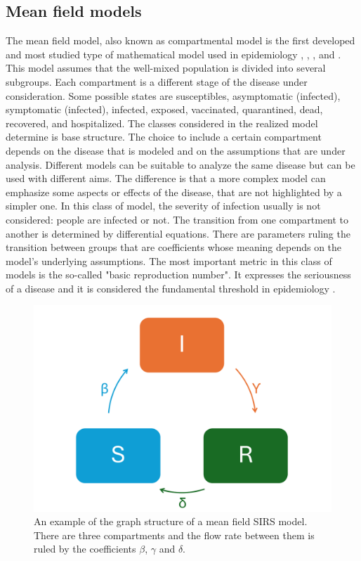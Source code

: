 \subsection{Mean field models}
\label{subsec:mean_field}
The mean field model, also known as compartmental model is the first developed and most studied type of mathematical model used in epidemiology \cite{kermack1927}, \cite{brauer2012mathematical}, \cite{Anderson_82}, and \cite{anderson1991infectious}.  This model assumes that the well-mixed population is divided into several subgroups. Each compartment is a different stage of the disease under consideration. Some possible states are susceptibles, asymptomatic (infected), symptomatic (infected), infected, exposed, vaccinated, quarantined, dead, recovered, and hospitalized. The classes considered in the realized model determine is base structure. The choice to include a certain compartment depends on the disease that is modeled and on the assumptions that are under analysis. Different models can be suitable to analyze the same disease but can be used with different aims. The difference is that a more complex model can emphasize some aspects or effects of the disease, that are not highlighted by a simpler one. 
In this class of model, the severity of infection usually is not considered: people are infected or not. The transition from one compartment to another is determined by differential equations. There are parameters ruling the transition between groups that are coefficients whose meaning depends on the model's underlying assumptions. The most important metric in this class of models is the so-called "basic reproduction number". It expresses the seriousness of a disease and it is considered the fundamental threshold in epidemiology \cite{Hernandez_Vargas_2022}. 
\begin{figure}[]
	\centering
	\includegraphics[width=0.65\linewidth]{0_introduction/images_introduction/SIRS_figure_compartmental}
	\caption[SIRS example]{An example of the graph structure of a mean field SIRS model. There are three compartments and the flow rate between them is ruled by the coefficients $\beta$, $\gamma$ and $\delta$.}
	\label{fig:sirsfigurecompartmental}
\end{figure}


